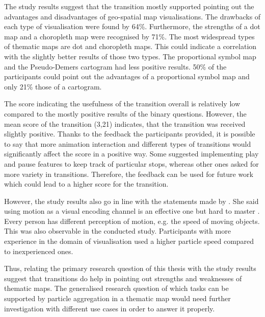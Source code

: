 The study results suggest that the transition mostly supported pointing out the advantages and disadvantages of geo-spatial map visualisations. The drawbacks of each type of visualisation were found by 64\%. Furthermore, the strengths of a dot map and a choropleth map were recognised by 71\%. The most widespread types of thematic maps are dot and choropleth maps. This could indicate a correlation with the slightly better results of those two types. The proportional symbol map and the Pseudo-Demers cartogram had less positive results. 50\% of the participants could point out the advantages of a proportional symbol map and only 21\% those of a cartogram.

The score indicating the usefulness of the transition overall is relatively low compared to the mostly positive results of the binary questions. However, the mean score of the transition (3,21) indicates, that the transition was received slightly positive. Thanks to the feedback the participants provided, it is possible to say that more animation interaction and different types of transitions would significantly affect the score in a positive way. Some suggested implementing play and pause features to keep track of particular stops, whereas other ones asked for more variety in transitions. Therefore, the feedback can be used for future work which could lead to a higher score for the transition.

However, the study results also go in line with the statements made by \citeauthor{Munzner2014}. She said using motion as a visual encoding channel is an effective one but hard to master . Every person has different perception of motion, e.g. the speed of moving objects. This was also observable in the conducted study. Participants with more experience in the domain of visualisation used a higher particle speed compared to inexperienced ones.

Thus, relating the primary research question of this thesis with the study results suggest that transitions do help in pointing out strengths and weaknesses of thematic maps. The generalised research question of which tasks can be supported by particle aggregation in a thematic map would need further investigation with different use cases in order to answer it properly.